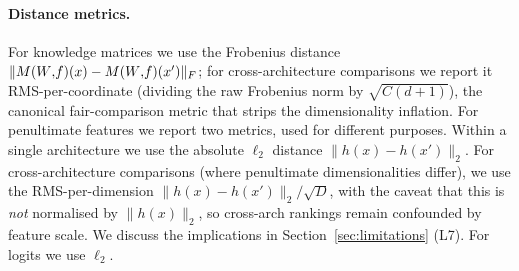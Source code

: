 \paragraph{Distance metrics.}
For knowledge matrices we use the Frobenius distance
$\| M(W{,}f)(x) - M(W{,}f)(x') \|_F$; for cross-architecture comparisons we report it
RMS-per-coordinate (dividing the raw Frobenius norm by $\sqrt{C(d{+}1)}$),
the canonical fair-comparison metric that strips the dimensionality
inflation. For penultimate features we report two metrics, used for
different purposes. Within a single architecture we use the absolute
$\ell_2$ distance $\| h(x) - h(x') \|_2$. For cross-architecture
comparisons (where penultimate dimensionalities differ), we use the
RMS-per-dimension $\| h(x) - h(x') \|_2 / \sqrt{D}$, with the caveat
that this is \emph{not} normalised by $\| h(x) \|_2$, so cross-arch
rankings remain confounded by feature scale. We discuss the
implications in Section~\ref{sec:limitations} (L7). For logits we use
$\ell_2$.

